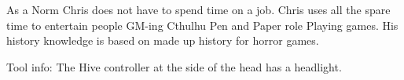 \begin{npcBox}[title=Norm: Chris]
    \begin{stressSection}
    \end{stressSection}
    \begin{tabularx}{\textwidth}{ XX }
    \end{tabularx}

    \begin{consequences}
    \item {}
    \item {}
    \item {}
    \end{consequences}

    \begin{npcDescription}

    As a Norm Chris does not have to spend time on a job. Chris uses all the spare time to entertain people GM-ing Cthulhu Pen and Paper role Playing games. His history knowledge is based on made up history for horror games.

    Tool info: The Hive controller at the side of the head has a headlight.

    \end{npcDescription}

\end{npcBox}



